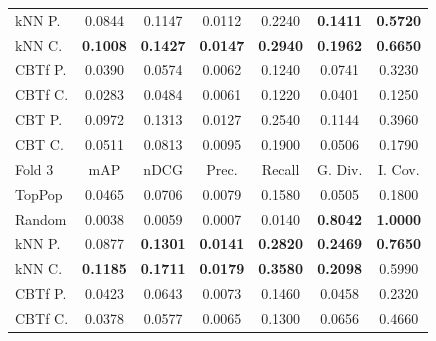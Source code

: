 \begin{table}[hbt]
\begin{tabulary}{\textwidth}{|L|CCCCCC|}
kNN P. & 0.0844 &           0.1147 &           0.0112 &           0.2240 &                                   \textbf{0.1411} &                                   \textbf{0.5720} \\
kNN C. & \textbf{0.1008} &  \textbf{0.1427} &  \textbf{0.0147} &  \textbf{0.2940} &                                   \textbf{0.1962} &                                   \textbf{0.6650} \\
CBTf P. & 0.0390 &           0.0574 &           0.0062 &           0.1240 &                                            0.0741 &                                            0.3230 \\
CBTf C. & 0.0283 &           0.0484 &           0.0061 &           0.1220 &                                            0.0401 &                                            0.1250 \\
CBT P. & 0.0972 &           0.1313 &           0.0127 &           0.2540 &                                            0.1144 &                                            0.3960 \\
CBT C. & 0.0511 &           0.0813 &           0.0095 &           0.1900 &                                            0.0506 &                                            0.1790 \\
\hline
\hline
Fold 3 & mAP & nDCG & Prec. & Recall & G. Div. & I. Cov. \\
\hline
TopPop & 0.0465 &           0.0706 &           0.0079 &           0.1580 &                                            0.0505 &                                            0.1800 \\
Random & 0.0038 &           0.0059 &           0.0007 &           0.0140 &                                   \textbf{0.8042} &                                   \textbf{1.0000} \\
kNN P. & 0.0877 &  \textbf{0.1301} &  \textbf{0.0141} &  \textbf{0.2820} &                                   \textbf{0.2469} &                                   \textbf{0.7650} \\
kNN C. & \textbf{0.1185} &  \textbf{0.1711} &  \textbf{0.0179} &  \textbf{0.3580} &                                   \textbf{0.2098} &                                            0.5990 \\
CBTf P. & 0.0423 &           0.0643 &           0.0073 &           0.1460 &                                            0.0458 &                                            0.2320 \\
CBTf C. & 0.0378 &           0.0577 &           0.0065 &           0.1300 &                                            0.0656 &                                            0.4660 \\

\end{tabulary}
\end{table}
